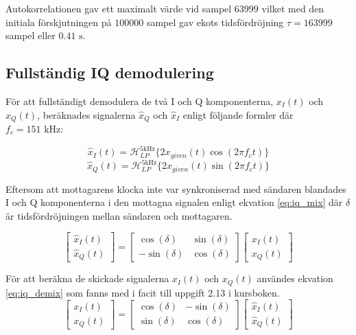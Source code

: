 \documentclass[10pt,twocolumn]{article}
\newcommand{\echodelay}{\tau}
\newcommand{\lpfilter}{\mathcal{H}_{LP}^{5 \text{kHz}}}
\begin{document}
Autokorrelationen gav ett maximalt värde vid sampel $63999$ vilket med den initiala förskjutningen på
$100000$ sampel gav ekots tidsfördröjning $\echodelay=163999$ sampel eller $0.41 \text{ s}$.

\subsection{Fullständig IQ demodulering}

För att fullständigt demodulera de två I och Q komponenterna, $x_I(t)$ och $x_Q(t)$, beräknades signalerna 
$\hat{x}_Q$ och $\hat{x}_I$ enligt följande formler där $f_c = 151\text{ kHz}$:

\[
    \hat{x}_I(t) = \lpfilter\{ 2 x_{given}(t) \cos(2\pi f_c t) \}
\]
\[
    \hat{x}_Q(t) = \lpfilter\{ 2 x_{given}(t) \sin(2\pi f_c t) \}
\]

Eftersom att mottagarens klocka inte var synkroniserad med sändaren blandades I och Q komponenterna
i den mottagna signalen enligt ekvation \ref{eq:iq_mix} där $\delta$ är tidsfördröjningen mellan sändaren och mottagaren.

\begin{equation}
    \label{eq:iq_mix}
    \left[
        \begin{array}{c}
            \hat{x}_I(t) \\
            \hat{x}_Q(t)
        \end{array}
    \right]
    =
    \left[
        \begin{array}{cc}
            \cos(\delta) & \sin(\delta) \\
            -\sin(\delta) & \cos(\delta)
        \end{array}
    \right]
    \left[
        \begin{array}{c}
            x_I(t) \\
            x_Q(t)
        \end{array}
    \right]
\end{equation}

För att beräkna de skickade signalerna $x_I(t)$ och $x_Q(t)$ användes ekvation \ref{eq:iq_demix} som
fanns med i facit till uppgift 2.13 i kursboken.
\begin{equation}
    \label{eq:iq_demix}
    \left[
        \begin{array}{c}
            x_I(t) \\
            x_Q(t)
        \end{array}
    \right]
    =
    \left[
        \begin{array}{cc}
            \cos(\delta) & -\sin(\delta) \\
            \sin(\delta) & \cos(\delta)
        \end{array}
    \right]
    \left[
        \begin{array}{c}
            \hat{x}_I(t) \\
            \hat{x}_Q(t)
        \end{array}
    \right]
\end{equation}
\end{document}
